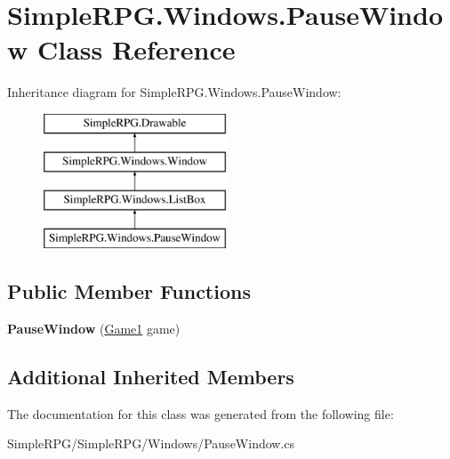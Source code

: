 \hypertarget{class_simple_r_p_g_1_1_windows_1_1_pause_window}{\section{Simple\-R\-P\-G.\-Windows.\-Pause\-Window Class Reference}
\label{class_simple_r_p_g_1_1_windows_1_1_pause_window}
}
Inheritance diagram for Simple\-R\-P\-G.\-Windows.\-Pause\-Window\-:\begin{figure}[H]
\begin{center}
\leavevmode
\includegraphics[height=4.000000cm]{class_simple_r_p_g_1_1_windows_1_1_pause_window}
\end{center}
\end{figure}
\subsection*{Public Member Functions}
\begin{DoxyCompactItemize}
\item 
\hypertarget{class_simple_r_p_g_1_1_windows_1_1_pause_window_a70df9c6ba9111340a7ef0dd7ecd09ab6}{{\bfseries Pause\-Window} (\hyperlink{class_simple_r_p_g_1_1_game1}{Game1} game)}\label{class_simple_r_p_g_1_1_windows_1_1_pause_window_a70df9c6ba9111340a7ef0dd7ecd09ab6}

\end{DoxyCompactItemize}
\subsection*{Additional Inherited Members}


The documentation for this class was generated from the following file\-:\begin{DoxyCompactItemize}
\item 
Simple\-R\-P\-G/\-Simple\-R\-P\-G/\-Windows/Pause\-Window.\-cs\end{DoxyCompactItemize}
